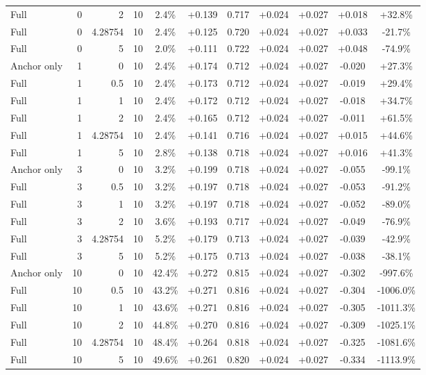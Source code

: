 \begin{table}[htbp]
\begin{tabular}{lrrrccccccc}
Full & 0 & 2 & 10 & 2.4\% & +0.139 & 0.717 & +0.024 & +0.027 & +0.018 & +32.8\% \\
Full & 0 & 4.28754 & 10 & 2.4\% & +0.125 & 0.720 & +0.024 & +0.027 & +0.033 & -21.7\% \\
Full & 0 & 5 & 10 & 2.0\% & +0.111 & 0.722 & +0.024 & +0.027 & +0.048 & -74.9\% \\
Anchor only & 1 & 0 & 10 & 2.4\% & +0.174 & 0.712 & +0.024 & +0.027 & -0.020 & +27.3\% \\
Full & 1 & 0.5 & 10 & 2.4\% & +0.173 & 0.712 & +0.024 & +0.027 & -0.019 & +29.4\% \\
Full & 1 & 1 & 10 & 2.4\% & +0.172 & 0.712 & +0.024 & +0.027 & -0.018 & +34.7\% \\
Full & 1 & 2 & 10 & 2.4\% & +0.165 & 0.712 & +0.024 & +0.027 & -0.011 & +61.5\% \\
Full & 1 & 4.28754 & 10 & 2.4\% & +0.141 & 0.716 & +0.024 & +0.027 & +0.015 & +44.6\% \\
Full & 1 & 5 & 10 & 2.8\% & +0.138 & 0.718 & +0.024 & +0.027 & +0.016 & +41.3\% \\
Anchor only & 3 & 0 & 10 & 3.2\% & +0.199 & 0.718 & +0.024 & +0.027 & -0.055 & -99.1\% \\
Full & 3 & 0.5 & 10 & 3.2\% & +0.197 & 0.718 & +0.024 & +0.027 & -0.053 & -91.2\% \\
Full & 3 & 1 & 10 & 3.2\% & +0.197 & 0.718 & +0.024 & +0.027 & -0.052 & -89.0\% \\
Full & 3 & 2 & 10 & 3.6\% & +0.193 & 0.717 & +0.024 & +0.027 & -0.049 & -76.9\% \\
Full & 3 & 4.28754 & 10 & 5.2\% & +0.179 & 0.713 & +0.024 & +0.027 & -0.039 & -42.9\% \\
Full & 3 & 5 & 10 & 5.2\% & +0.175 & 0.713 & +0.024 & +0.027 & -0.038 & -38.1\% \\
Anchor only & 10 & 0 & 10 & 42.4\% & +0.272 & 0.815 & +0.024 & +0.027 & -0.302 & -997.6\% \\
Full & 10 & 0.5 & 10 & 43.2\% & +0.271 & 0.816 & +0.024 & +0.027 & -0.304 & -1006.0\% \\
Full & 10 & 1 & 10 & 43.6\% & +0.271 & 0.816 & +0.024 & +0.027 & -0.305 & -1011.3\% \\
Full & 10 & 2 & 10 & 44.8\% & +0.270 & 0.816 & +0.024 & +0.027 & -0.309 & -1025.1\% \\
Full & 10 & 4.28754 & 10 & 48.4\% & +0.264 & 0.818 & +0.024 & +0.027 & -0.325 & -1081.6\% \\
Full & 10 & 5 & 10 & 49.6\% & +0.261 & 0.820 & +0.024 & +0.027 & -0.334 & -1113.9\% \\

\end{tabular}
\end{table}
